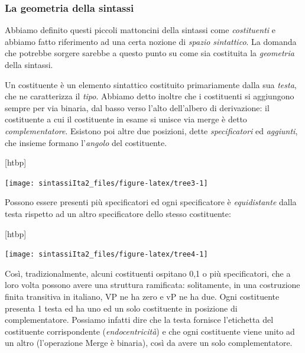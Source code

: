 \documentclass[
  a4paper,
  twoside,
  11pt,
  chapterprefix=false,
  bibliography=totocnumbered,
  listof=flat]{scrbook}
\makeatletter
\def\fps@figure{htbp}
\renewenvironment{figure}[1][\fps@figure]{
  \edef\@tempa{\noexpand\@float{figure}[#1]} 
  \@tempa
  \sffamily
}{
  \end@float
}
\makeatother
\begin{document}
\hypertarget{la-geometria-della-sintassi}{%
\subsubsection{La geometria della sintassi}\label{la-geometria-della-sintassi}}

Abbiamo definito questi piccoli mattoncini della sintassi come \emph{costituenti} e abbiamo fatto riferimento ad una certa nozione di \emph{spazio sintattico}. La domanda che potrebbe sorgere sarebbe a questo punto su come sia costituita la \emph{geometria} della sintassi.

Un costituente è un elemento sintattico costituito primariamente dalla sua \emph{testa}, che ne caratterizza il \emph{tipo}. Abbiamo detto inoltre che i costituenti si aggiungono sempre per via binaria, dal basso verso l'alto dell'albero di derivazione: il costituente a cui il costituente in esame si unisce via merge è detto \emph{complementatore}.
Esistono poi altre due posizioni, dette \emph{specificatori} ed \emph{aggiunti}, che insieme formano l'\emph{angolo} del costituente.

\begin{figure}

{\centering \texttt{[image: sintassiIta2\_files/figure-latex/tree3-1]} 

}

\caption{Raffigurazione di un costituente}\label{fig:tree3}
\end{figure}

Possono essere presenti più specificatori ed ogni specificatore è \emph{equidistante} dalla testa rispetto ad un altro specificatore dello stesso costituente:

\begin{figure}

{\centering \texttt{[image: sintassiIta2\_files/figure-latex/tree4-1]} 

}

\caption{Un costituente XP}\label{fig:tree4}
\end{figure}

Così, tradizionalmente, alcuni costituenti ospitano 0,1 o più specificatori, che a loro volta possono avere una struttura ramificata: solitamente, in una costruzione finita transitiva in italiano, VP ne ha zero e vP ne ha due.
Ogni costituente presenta 1 testa ed ha uno ed un solo costituente in posizione di complementatore.
Possiamo infatti dire che la testa fornisce l'etichetta del costituente corrispondente (\emph{endocentricità}) e che ogni costituente viene unito ad un altro (l'operazione Merge è binaria), così da avere un solo complementatore.
\end{document}
